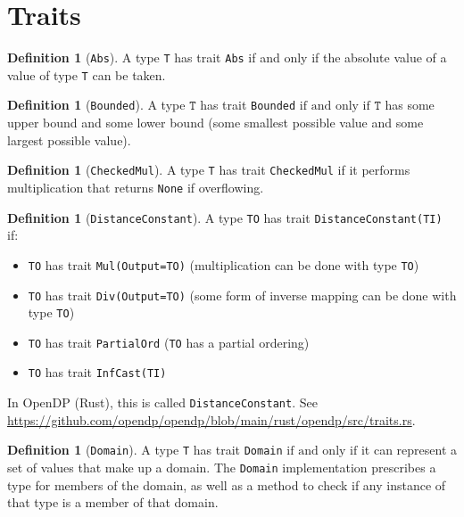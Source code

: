 \documentclass[11pt,a4paper]{article}
\theoremstyle{definition}
\newtheorem{definition}[theorem]{Definition}
\newcommand{\inOpenDPRust}[2]{In OpenDP (Rust), this is called \texttt{#1}. See \url{#2}.}
\newcommand{\T}{\texttt{T}}
\newcommand{\iffText}{\text{if and only if}}
\begin{document}
\section{Traits}

\begin{definition}[\texttt{Abs}]
    A type \texttt{T} has trait \texttt{Abs} if and only if the absolute value of a value of type \texttt{T} can be taken.
\end{definition}

\begin{definition}[\texttt{Bounded}]
    A type $\T$ has trait \texttt{Bounded} $\iffText$ $\T$ has some upper bound and some lower bound (some smallest possible value and some largest possible value).
\end{definition}

\begin{definition}[\texttt{CheckedMul}]
    A type \texttt{T} has trait \texttt{CheckedMul} if it performs multiplication that returns \texttt{None} if overflowing.
\end{definition}

\begin{definition}[\texttt{DistanceConstant}]
    A type \texttt{TO} has trait \texttt{DistanceConstant(TI)} if:
    \begin{itemize}
        \item \texttt{TO} has trait \texttt{Mul(Output=TO)} (multiplication can be done with type \texttt{TO})
        \item \texttt{TO} has trait \texttt{Div(Output=TO)} (some form of inverse mapping can be done with type \texttt{TO})
        \item \texttt{TO} has trait \texttt{PartialOrd} (\texttt{TO} has a partial ordering)
        \item \texttt{TO} has trait \texttt{InfCast(TI)}
    \end{itemize}
    
    \inOpenDPRust{DistanceConstant}{https://github.com/opendp/opendp/blob/main/rust/opendp/src/traits.rs}
\end{definition}

\begin{definition}[\texttt{Domain}]
\label{defn:traits-domain}
A type \texttt{T} has trait \texttt{Domain} $\iffText$ it can represent a set of values that make up a domain. The \texttt{Domain} implementation prescribes a type for members of the domain, as well as a method to check if any instance of that type is a member of that domain.
\end{definition}
\end{document}
